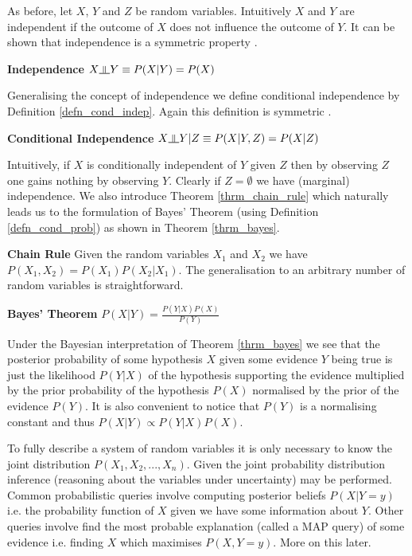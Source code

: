 \documentclass[../masters.tex]{subfiles}
\begin{document}
As before, let $X$, $Y$ and $Z$ be random variables. Intuitively $X$ and $Y$ are independent if the outcome of $X$ does not influence the outcome of $Y$. It can be shown that independence is a symmetric property \cite{koller}.
\begin{defn}
\textbf{Independence} $X \indep Y \equiv P(X|Y) = P(X)$ 
\label{defn_indep}
\end{defn}
Generalising the concept of independence we define conditional independence by Definition \ref{defn_cond_indep}. Again this definition is symmetric \cite{koller}.
\begin{defn}
\textbf{Conditional Independence} $X \indep Y | Z \equiv P(X|Y,Z) = P(X|Z)$
\label{defn_cond_indep}
\end{defn}
Intuitively, if $X$ is conditionally independent of $Y$ given $Z$ then by observing $Z$ one gains nothing by observing $Y$. Clearly if $Z=\emptyset$ we have (marginal) independence. We also introduce Theorem \ref{thrm_chain_rule} which naturally leads us to the formulation of Bayes' Theorem (using Definition \ref{defn_cond_prob}) as shown in Theorem \ref{thrm_bayes}. 
\begin{thrm}
\label{thrm_chain_rule}  
\textbf{Chain Rule} Given the random variables $X_1$ and $X_2$ we have $P(X_1,X_2) = P(X_1)P(X_2|X_1)$. The generalisation to an arbitrary number of random variables is straightforward.
\end{thrm}
\begin{thrm}
\textbf{Bayes' Theorem} $P(X|Y) = \frac{P(Y|X)P(X)}{P(Y)}$
\label{thrm_bayes}
\end{thrm}
Under the Bayesian interpretation of Theorem \ref{thrm_bayes} we see that the posterior probability of some hypothesis $X$ given some evidence $Y$ being true is just the likelihood $P(Y|X)$ of the hypothesis supporting the evidence multiplied by the prior probability of the hypothesis $P(X)$ normalised by the prior of the evidence $P(Y)$. It is also convenient to notice that $P(Y)$ is a normalising constant and thus  $P(X|Y) \propto P(Y|X)P(X)$.

To fully describe a system of random variables it is only necessary to know the joint distribution $P(X_1,X_2,...,X_n)$. Given the joint probability distribution inference (reasoning about the variables under uncertainty) may be performed. Common probabilistic queries involve computing posterior beliefs $P(X|Y=y)$ i.e. the probability function of $X$ given we have some information about $Y$. Other queries involve find the most probable explanation (called a MAP query) of some evidence i.e. finding $X$ which maximises $P(X, Y=y)$. More on this later. 
\end{document}
